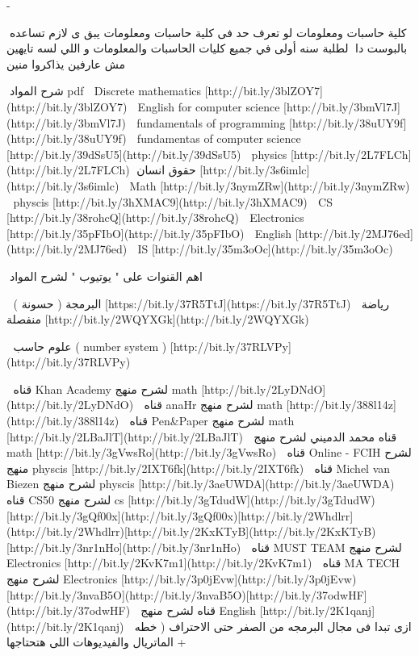 - 
    
    🌷كلية حاسبات ومعلومات
    لو تعرف حد فى كلية حاسبات ومعلومات يبق ى لازم تساعده بالبوست دا
    🌷لطلبة سنه أولى في جميع كليات الحاسبات والمعلومات  و اللي لسه تايهين مش عارفين يذاكروا منين
    
    🌷شرح المواد pdf
    🥀 Discrete mathematics [http://bit.ly/3blZOY7](http://bit.ly/3blZOY7)
    🥀 English for computer science [http://bit.ly/3bmVl7J](http://bit.ly/3bmVl7J)
    🥀 fundamentals of programming [http://bit.ly/38uUY9f](http://bit.ly/38uUY9f)
    🥀 fundamentas of computer science [http://bit.ly/39dSsU5](http://bit.ly/39dSsU5)
    🥀 physics [http://bit.ly/2L7FLCh](http://bit.ly/2L7FLCh)
    🥀حقوق انسان [http://bit.ly/3s6imlc](http://bit.ly/3s6imlc)
    🥀 Math [http://bit.ly/3nymZRw](http://bit.ly/3nymZRw)
    🥀 physcis  [http://bit.ly/3hXMAC9](http://bit.ly/3hXMAC9)
    🥀 CS [http://bit.ly/38rohcQ](http://bit.ly/38rohcQ)
    🥀 Electronics [http://bit.ly/35pFIbO](http://bit.ly/35pFIbO)
    🥀 English  [http://bit.ly/2MJ76ed](http://bit.ly/2MJ76ed)
    🥀 IS [http://bit.ly/35m3oOc](http://bit.ly/35m3oOc)
    
    🌷اهم القنوات على " يوتيوب " لشرح المواد
    
    🥀 البرمجة ( حسونة )
    [https://bit.ly/37R5TtJ](https://bit.ly/37R5TtJ)
    🥀 رياضة منفصلة
    [http://bit.ly/2WQYXGk](http://bit.ly/2WQYXGk)
    
    🥀 علوم حاسب ( number system )
    [http://bit.ly/37RLVPy](http://bit.ly/37RLVPy)
    
    🥀 قناه Khan Academy لشرح منهج math
    [http://bit.ly/2LyDNdO](http://bit.ly/2LyDNdO)
    🥀  قناه anaHr لشرح منهج math
    [http://bit.ly/388l14z](http://bit.ly/388l14z)
    🥀 قناه Pen&Paper لشرح منهج math
    [http://bit.ly/2LBaJlT](http://bit.ly/2LBaJlT)
    🥀  قناه محمد الدميني لشرح منهج math
    [http://bit.ly/3gVwsRo](http://bit.ly/3gVwsRo)
    🥀 قناه Online - FCIH  لشرح منهج physcis
    [http://bit.ly/2IXT6fk](http://bit.ly/2IXT6fk)
    🥀 قناه Michel van Biezen  لشرح منهج physcis
    [http://bit.ly/3aeUWDA](http://bit.ly/3aeUWDA)
    🥀 قناه CS50  لشرح منهج  cs
    [http://bit.ly/3gTdudW](http://bit.ly/3gTdudW)[http://bit.ly/3gQf00x](http://bit.ly/3gQf00x)[http://bit.ly/2Whdlrr](http://bit.ly/2Whdlrr)[http://bit.ly/2KxKTyB](http://bit.ly/2KxKTyB)[http://bit.ly/3nr1nHo](http://bit.ly/3nr1nHo)
    🥀 قناه MUST TEAM  لشرح منهج  Electronics
    [http://bit.ly/2KvK7m1](http://bit.ly/2KvK7m1)
    🥀 قناه MA TECH  لشرح منهج  Electronics
    [http://bit.ly/3p0jEvw](http://bit.ly/3p0jEvw)[http://bit.ly/3nvaB5O](http://bit.ly/3nvaB5O)[http://bit.ly/37odwHF](http://bit.ly/37odwHF)
    🥀 قناه   لشرح منهج  English
    [http://bit.ly/2K1qanj](http://bit.ly/2K1qanj)
    🥀 ازى تبدا فى مجال البرمجه من الصفر حتى الاحتراف ( خطه + الماتريال  والفيديوهات اللى هتحتاجها
    
